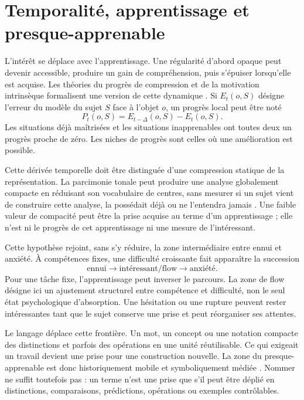 \documentclass[11pt,a4paper]{article}
\begin{document}
\section{Temporalité, apprentissage et presque-apprenable}

L'intérêt se déplace avec l'apprentissage. Une régularité d'abord opaque peut
devenir accessible, produire un gain de compréhension, puis s'épuiser lorsqu'elle
est acquise. Les théories du progrès de compression et de la motivation
intrinsèque formalisent une version de cette dynamique
\parencite{schmidhuber1997interesting,schmidhuber2009compression,oudeyer2007intrinsic,oudeyer2007typology}.
Si \(E_t(o,S)\) désigne l'erreur du modèle du sujet \(S\) face à l'objet \(o\),
un progrès local peut être noté
\[
  P_t(o,S)=E_{t-\Delta}(o,S)-E_t(o,S).
\]
Les situations déjà maîtrisées et les situations inapprenables ont toutes deux
un progrès proche de zéro. Les niches de progrès sont celles où une amélioration
est possible.

Cette dérivée temporelle doit être distinguée d'une compression statique de la
représentation. La parcimonie tonale peut produire une analyse globalement
compacte en réduisant son vocabulaire de centres, sans mesurer si un sujet vient
de construire cette analyse, la possédait déjà ou ne l'entendra jamais
\parencite{pachet2026tonalparsimony}. Une faible valeur de compacité peut être la
prise acquise au terme d'un apprentissage ; elle n'est ni le progrès de cet
apprentissage ni une mesure de l'intéressant.

Cette hypothèse rejoint, sans s'y réduire, la zone intermédiaire entre ennui et
anxiété. À compétences fixes, une difficulté croissante fait apparaître la
succession
\[
  \text{ennui}\longrightarrow\text{intéressant/flow}
  \longrightarrow\text{anxiété}.
\]
Pour une tâche fixe, l'apprentissage peut inverser le parcours. La zone de flow
désigne ici un ajustement structurel entre compétence et difficulté, non le seul
état psychologique d'absorption. Une hésitation ou une rupture peuvent rester
intéressantes tant que le sujet conserve une prise et peut réorganiser ses
attentes.

Le langage déplace cette frontière. Un mot, un concept ou une notation compacte
des distinctions et parfois des opérations en une unité réutilisable. Ce qui
exigeait un travail devient une prise pour une construction nouvelle. La zone
du presque-apprenable est donc historiquement mobile et symboliquement médiée
\parencite{vygotsky1978mind,lenat1991thresholds,lenat2008turtle,koestler1989act,steels2005coordinating,steels2015talkingheads}.
Nommer ne suffit toutefois pas : un terme n'est une prise que s'il peut être
déplié en distinctions, comparaisons, prédictions, opérations ou exemples
contrôlables.
\end{document}
